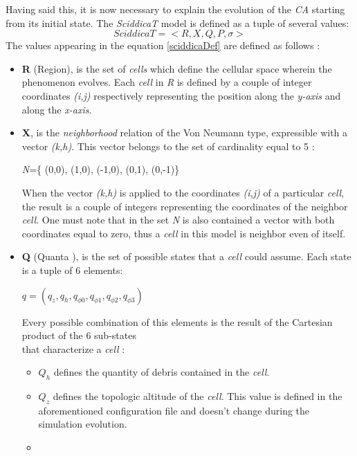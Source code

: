 \documentclass[12pt,a4paper,fleqn]{report}
\begin{document}
 Having said this, it is now necessary to explain the evolution of the \textit{CA} starting from its initial state. The \textit{SciddicaT} model is defined as a tuple of several values:
 \begin{equation}
 \label{sciddicaDef}
 SciddicaT = <R,X,Q,P,\sigma>
 \end{equation}
The values appearing in the equation \ref{sciddicaDef} are defined as follows :
\begin{itemize}
\item
\textbf{R} (Region), is the set of \textit{cells} which define the cellular space wherein the phenomenon evolves. Each \textit{cell} in \textit{R} is defined by a couple of integer coordinates \textit{(i,j)} respectively representing the position along the \textit{y-axis} and along the \textit{x-axis}.
\item
\textbf{X}, is the \textit{neighborhood} relation of the Von Neumann type, expressible with a vector \textit{(k,h)}. This vector belongs to the set of cardinality equal to 5 :\\
\begin{center}
\textit{N}=\Big\{ (0,0), (1,0), (-1,0), (0,1), (0,-1)\Big\}
\end{center}
When the vector \textit{(k,h)} is applied to the coordinates \textit{(i,j)} of a particular \textit{cell}, the result is a couple of integers representing the coordinates of the neighbor \textit{cell}. One must note that in the set \textit{N} is also contained a vector with both coordinates equal to zero, thus a \textit{cell} in this model is neighbor even of itself.
\item
\textbf{Q} (Quanta \cite{4} ), is the set of possible states that a \textit{cell} could assume. Each state is a tuple of 6 elements: 
\begin{center}
$q=(q_z,q_h,q_{\phi0},q_{\phi1},q_{\phi2},q_{\phi3})$
\end{center}
Every possible combination of this elements is the result of the Cartesian product of the 6 sub-states\\ 
that characterize a \textit{cell} :
\begin{itemize}
\item
$Q_h$ defines the quantity of debris contained in the \textit{cell}.
\item
$Q_z$ defines the topologic altitude of the \textit{cell}. This value is defined in the aforementioned configuration file and doesn't change during the simulation evolution. 
\item

\end{itemize}
\end{itemize}
\end{document}
